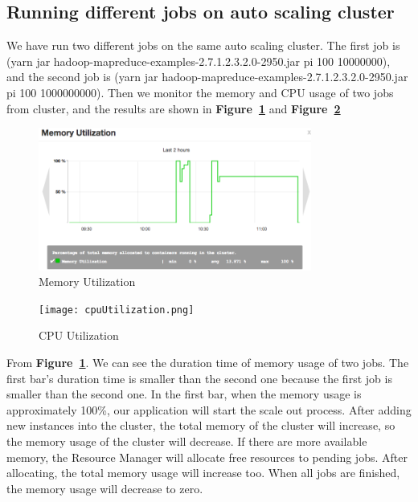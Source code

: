 \documentclass{article}
\begin{document}
\subsection{Running different jobs on auto scaling cluster}
We have run two different jobs on the same auto scaling cluster. The first job is (yarn jar hadoop-mapreduce-examples-2.7.1.2.3.2.0-2950.jar pi 100 10000000), and the second job is (yarn jar hadoop-mapreduce-examples-2.7.1.2.3.2.0-2950.jar pi 100 1000000000). Then we monitor the memory and CPU usage of two jobs from cluster, and the results are shown in \textbf{Figure~\ref{fig:memoryUtilization}} and \textbf{Figure~\ref{fig:cpuUtilization}}
\begin{figure}[ht!]
 \centering
 \includegraphics[width=0.8\textwidth,natwidth=1000,natheight=800]{memoryUtilization.png}
 \caption{Memory Utilization}
 \label{fig:memoryUtilization}
 \end{figure}
 
 \begin{figure}[ht!]
 \centering
 \texttt{[image: cpuUtilization.png]}
 \caption{CPU Utilization}
 \label{fig:cpuUtilization}
 \end{figure}
 
From \textbf{Figure~\ref{fig:memoryUtilization}}. We can see the duration time of memory usage of two jobs. The first bar's duration time is smaller than the second one because the first job is smaller than the second one. In the first bar, when the memory usage is approximately 100\%, our application will start the scale out process. After adding new instances into the cluster, the total memory of the cluster will increase, so the memory usage of the cluster will decrease. If there are more available memory, the Resource Manager will allocate free resources to pending jobs. After allocating, the total memory usage will increase too. When all jobs are finished, the memory usage will decrease to zero.
 
\end{document}
